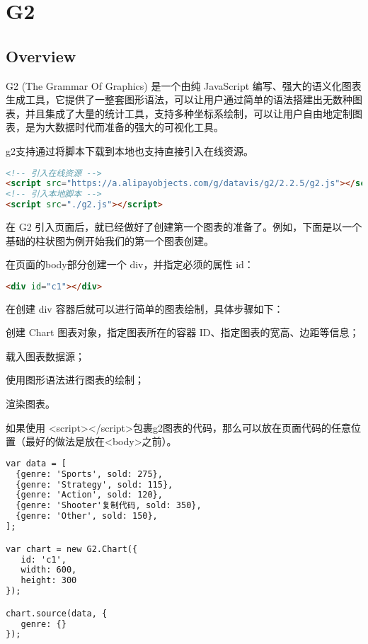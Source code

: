 \part{G2}

\chapter{Overview}


G2 (The Grammar Of Graphics) 是一个由纯 JavaScript 编写、强大的语义化图表生成工具，它提供了一整套图形语法，可以让用户通过简单的语法搭建出无数种图表，并且集成了大量的统计工具，支持多种坐标系绘制，可以让用户自由地定制图表，是为大数据时代而准备的强大的可视化工具。

g2支持通过将脚本下载到本地也支持直接引入在线资源。

\begin{lstlisting}[language=HTML]
<!-- 引入在线资源 -->
<script src="https://a.alipayobjects.com/g/datavis/g2/2.2.5/g2.js"></script>
<!-- 引入本地脚本 -->
<script src="./g2.js"></script>
\end{lstlisting}

在 G2 引入页面后，就已经做好了创建第一个图表的准备了。例如，下面是以一个基础的柱状图为例开始我们的第一个图表创建。

在页面的body部分创建一个 div，并指定必须的属性 id：

\begin{lstlisting}[language=HTML]
<div id="c1"></div>
\end{lstlisting}

在创建 div 容器后就可以进行简单的图表绘制，具体步骤如下：

\begin{compactenum}
\item 创建 Chart 图表对象，指定图表所在的容器 ID、指定图表的宽高、边距等信息；
\item 载入图表数据源；
\item 使用图形语法进行图表的绘制；
\item 渲染图表。
\end{compactenum}


如果使用 <script></script>包裹g2图表的代码，那么可以放在页面代码的任意位置（最好的做法是放在<body>之前）。


\begin{lstlisting}[language=HTML]
var data = [
  {genre: 'Sports', sold: 275},
  {genre: 'Strategy', sold: 115},
  {genre: 'Action', sold: 120},
  {genre: 'Shooter'复制代码, sold: 350},
  {genre: 'Other', sold: 150},
];

var chart = new G2.Chart({
   id: 'c1',
   width: 600,
   height: 300
});

chart.source(data, {
   genre: {}
});
\end{lstlisting}

